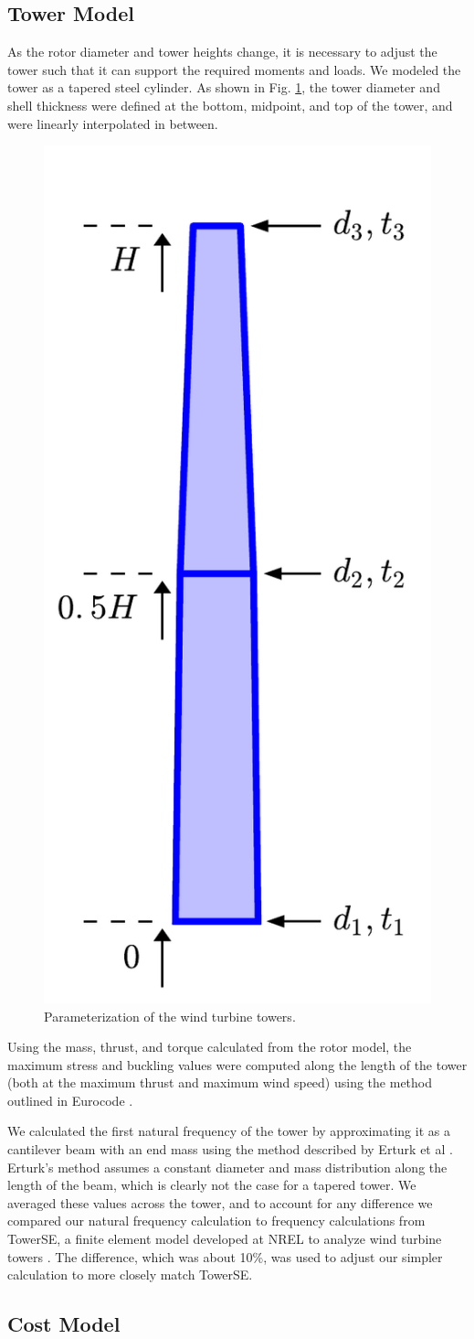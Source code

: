 \documentclass[conf]{new-aiaa}
\begin{document}
\subsection{Tower Model}
As the rotor diameter and tower heights change, it is necessary to adjust the tower such that it can support the required moments and loads. We modeled the tower as a tapered steel cylinder. As shown in Fig. \ref{tower_def}, the tower diameter and shell thickness were defined at the bottom, midpoint, and top of the tower, and were linearly interpolated in between.
\begin{figure}[htbp]
\centering
\includegraphics[width=.25\textwidth]{tower_param.pdf}
\caption{\label{tower_def}Parameterization of the wind turbine towers.}
\end{figure}
Using the mass, thrust, and torque calculated from the rotor model, the maximum stress and buckling values were computed along the length of the tower (both at the maximum thrust and maximum wind speed) using the method outlined in Eurocode \cite{eurocode3}.

We calculated the first natural frequency of the tower by approximating it as a cantilever beam with an end mass using the method described by Erturk et al \cite{erturk2011appendix}. Erturk's method assumes a constant diameter and mass distribution along the length of the beam, which is clearly not the case for a tapered tower. We averaged these values across the tower, and to account for any difference we compared our natural frequency calculation to frequency calculations from TowerSE, a finite element model developed at NREL to analyze wind turbine towers \cite{ning2013towerse}. The difference, which was about 10\%, was used to adjust our simpler calculation to more closely match TowerSE.

\subsection{Cost Model}
\end{document}
